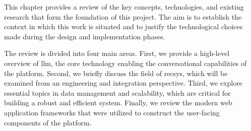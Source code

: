 This chapter provides a review of the key concepts, technologies, and existing research that form the foundation of this project. The aim is to establish the context in which this work is situated and to justify the technological choices made during the design and implementation phases.

The review is divided into four main areas. First, we provide a high-level overview of \ac{llm}, the core technology enabling the conversational capabilities of the platform. Second, we briefly discuss the field of \ac{recsys}, which will be examined from an engineering and integration perspective. Third, we explore essential topics in data management and scalability, which are critical for building a robust and efficient system. Finally, we review the modern web application frameworks that were utilized to construct the user-facing components of the platform.